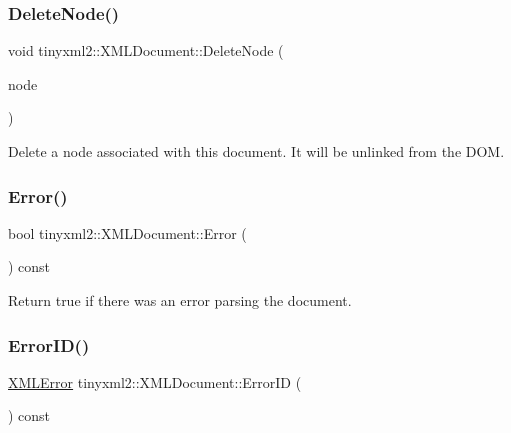\subsubsection{\texorpdfstring{Delete\+Node()}{DeleteNode()}}
{\footnotesize\ttfamily void tinyxml2\+::\+X\+M\+L\+Document\+::\+Delete\+Node (\begin{DoxyParamCaption}\item[{\mbox{\hyperlink{classtinyxml2_1_1_x_m_l_node}{X\+M\+L\+Node}} $\ast$}]{node }\end{DoxyParamCaption})}

Delete a node associated with this document. It will be unlinked from the D\+OM. \mbox{\label{classtinyxml2_1_1_x_m_l_document_a34e6318e182e40e3cc4f4ba5d59ed9ed}} 
\subsubsection{\texorpdfstring{Error()}{Error()}}
{\footnotesize\ttfamily bool tinyxml2\+::\+X\+M\+L\+Document\+::\+Error (\begin{DoxyParamCaption}{ }\end{DoxyParamCaption}) const\hspace{0.3cm}{\ttfamily [inline]}}



Return true if there was an error parsing the document. 

\mbox{\label{classtinyxml2_1_1_x_m_l_document_afa3ed33b3107f920ec2b301f805ac17d}} 
\subsubsection{\texorpdfstring{Error\+I\+D()}{ErrorID()}}
{\footnotesize\ttfamily \mbox{\hyperlink{namespacetinyxml2_a1fbf88509c3ac88c09117b1947414e08}{X\+M\+L\+Error}} tinyxml2\+::\+X\+M\+L\+Document\+::\+Error\+ID (\begin{DoxyParamCaption}{ }\end{DoxyParamCaption}) const\hspace{0.3cm}{\ttfamily [inline]}}



